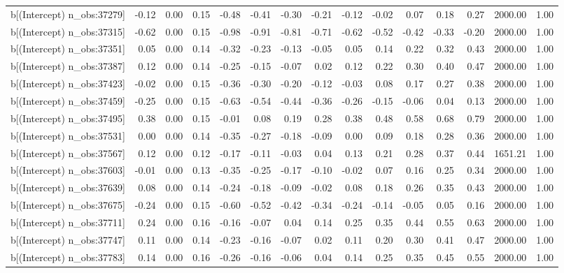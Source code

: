 \begin{table}[ht]
\begin{tabular}{rrrrrrrrrrrrrrr}
  b[(Intercept) n\_obs:37279] & -0.12 & 0.00 & 0.15 & -0.48 & -0.41 & -0.30 & -0.21 & -0.12 & -0.02 & 0.07 & 0.18 & 0.27 & 2000.00 & 1.00 \\ 
  b[(Intercept) n\_obs:37315] & -0.62 & 0.00 & 0.15 & -0.98 & -0.91 & -0.81 & -0.71 & -0.62 & -0.52 & -0.42 & -0.33 & -0.20 & 2000.00 & 1.00 \\ 
  b[(Intercept) n\_obs:37351] & 0.05 & 0.00 & 0.14 & -0.32 & -0.23 & -0.13 & -0.05 & 0.05 & 0.14 & 0.22 & 0.32 & 0.43 & 2000.00 & 1.00 \\ 
  b[(Intercept) n\_obs:37387] & 0.12 & 0.00 & 0.14 & -0.25 & -0.15 & -0.07 & 0.02 & 0.12 & 0.22 & 0.30 & 0.40 & 0.47 & 2000.00 & 1.00 \\ 
  b[(Intercept) n\_obs:37423] & -0.02 & 0.00 & 0.15 & -0.36 & -0.30 & -0.20 & -0.12 & -0.03 & 0.08 & 0.17 & 0.27 & 0.38 & 2000.00 & 1.00 \\ 
  b[(Intercept) n\_obs:37459] & -0.25 & 0.00 & 0.15 & -0.63 & -0.54 & -0.44 & -0.36 & -0.26 & -0.15 & -0.06 & 0.04 & 0.13 & 2000.00 & 1.00 \\ 
  b[(Intercept) n\_obs:37495] & 0.38 & 0.00 & 0.15 & -0.01 & 0.08 & 0.19 & 0.28 & 0.38 & 0.48 & 0.58 & 0.68 & 0.79 & 2000.00 & 1.00 \\ 
  b[(Intercept) n\_obs:37531] & 0.00 & 0.00 & 0.14 & -0.35 & -0.27 & -0.18 & -0.09 & 0.00 & 0.09 & 0.18 & 0.28 & 0.36 & 2000.00 & 1.00 \\ 
  b[(Intercept) n\_obs:37567] & 0.12 & 0.00 & 0.12 & -0.17 & -0.11 & -0.03 & 0.04 & 0.13 & 0.21 & 0.28 & 0.37 & 0.44 & 1651.21 & 1.00 \\ 
  b[(Intercept) n\_obs:37603] & -0.01 & 0.00 & 0.13 & -0.35 & -0.25 & -0.17 & -0.10 & -0.02 & 0.07 & 0.16 & 0.25 & 0.34 & 2000.00 & 1.00 \\ 
  b[(Intercept) n\_obs:37639] & 0.08 & 0.00 & 0.14 & -0.24 & -0.18 & -0.09 & -0.02 & 0.08 & 0.18 & 0.26 & 0.35 & 0.43 & 2000.00 & 1.00 \\ 
  b[(Intercept) n\_obs:37675] & -0.24 & 0.00 & 0.15 & -0.60 & -0.52 & -0.42 & -0.34 & -0.24 & -0.14 & -0.05 & 0.05 & 0.16 & 2000.00 & 1.00 \\ 
  b[(Intercept) n\_obs:37711] & 0.24 & 0.00 & 0.16 & -0.16 & -0.07 & 0.04 & 0.14 & 0.25 & 0.35 & 0.44 & 0.55 & 0.63 & 2000.00 & 1.00 \\ 
  b[(Intercept) n\_obs:37747] & 0.11 & 0.00 & 0.14 & -0.23 & -0.16 & -0.07 & 0.02 & 0.11 & 0.20 & 0.30 & 0.41 & 0.47 & 2000.00 & 1.00 \\ 
  b[(Intercept) n\_obs:37783] & 0.14 & 0.00 & 0.16 & -0.26 & -0.16 & -0.06 & 0.04 & 0.14 & 0.25 & 0.35 & 0.45 & 0.55 & 2000.00 & 1.00 \\ 

\end{tabular}
\end{table}
